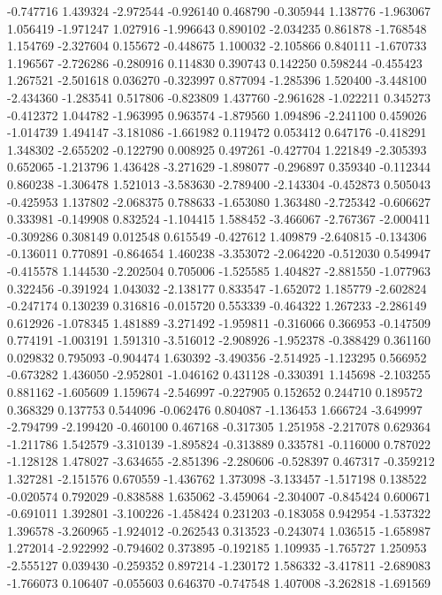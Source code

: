 -0.747716
1.439324
-2.972544
-0.926140
0.468790
-0.305944
1.138776
-1.963067
1.056419
-1.971247
1.027916
-1.996643
0.890102
-2.034235
0.861878
-1.768548
1.154769
-2.327604
0.155672
-0.448675
1.100032
-2.105866
0.840111
-1.670733
1.196567
-2.726286
-0.280916
0.114830
0.390743
0.142250
0.598244
-0.455423
1.267521
-2.501618
0.036270
-0.323997
0.877094
-1.285396
1.520400
-3.448100
-2.434360
-1.283541
0.517806
-0.823809
1.437760
-2.961628
-1.022211
0.345273
-0.412372
1.044782
-1.963995
0.963574
-1.879560
1.094896
-2.241100
0.459026
-1.014739
1.494147
-3.181086
-1.661982
0.119472
0.053412
0.647176
-0.418291
1.348302
-2.655202
-0.122790
0.008925
0.497261
-0.427704
1.221849
-2.305393
0.652065
-1.213796
1.436428
-3.271629
-1.898077
-0.296897
0.359340
-0.112344
0.860238
-1.306478
1.521013
-3.583630
-2.789400
-2.143304
-0.452873
0.505043
-0.425953
1.137802
-2.068375
0.788633
-1.653080
1.363480
-2.725342
-0.606627
0.333981
-0.149908
0.832524
-1.104415
1.588452
-3.466067
-2.767367
-2.000411
-0.309286
0.308149
0.012548
0.615549
-0.427612
1.409879
-2.640815
-0.134306
-0.136011
0.770891
-0.864654
1.460238
-3.353072
-2.064220
-0.512030
0.549947
-0.415578
1.144530
-2.202504
0.705006
-1.525585
1.404827
-2.881550
-1.077963
0.322456
-0.391924
1.043032
-2.138177
0.833547
-1.652072
1.185779
-2.602824
-0.247174
0.130239
0.316816
-0.015720
0.553339
-0.464322
1.267233
-2.286149
0.612926
-1.078345
1.481889
-3.271492
-1.959811
-0.316066
0.366953
-0.147509
0.774191
-1.003191
1.591310
-3.516012
-2.908926
-1.952378
-0.388429
0.361160
0.029832
0.795093
-0.904474
1.630392
-3.490356
-2.514925
-1.123295
0.566952
-0.673282
1.436050
-2.952801
-1.046162
0.431128
-0.330391
1.145698
-2.103255
0.881162
-1.605609
1.159674
-2.546997
-0.227905
0.152652
0.244710
0.189572
0.368329
0.137753
0.544096
-0.062476
0.804087
-1.136453
1.666724
-3.649997
-2.794799
-2.199420
-0.460100
0.467168
-0.317305
1.251958
-2.217078
0.629364
-1.211786
1.542579
-3.310139
-1.895824
-0.313889
0.335781
-0.116000
0.787022
-1.128128
1.478027
-3.634655
-2.851396
-2.280606
-0.528397
0.467317
-0.359212
1.327281
-2.151576
0.670559
-1.436762
1.373098
-3.133457
-1.517198
0.138522
-0.020574
0.792029
-0.838588
1.635062
-3.459064
-2.304007
-0.845424
0.600671
-0.691011
1.392801
-3.100226
-1.458424
0.231203
-0.183058
0.942954
-1.537322
1.396578
-3.260965
-1.924012
-0.262543
0.313523
-0.243074
1.036515
-1.658987
1.272014
-2.922992
-0.794602
0.373895
-0.192185
1.109935
-1.765727
1.250953
-2.555127
0.039430
-0.259352
0.897214
-1.230172
1.586332
-3.417811
-2.689083
-1.766073
0.106407
-0.055603
0.646370
-0.747548
1.407008
-3.262818
-1.691569

